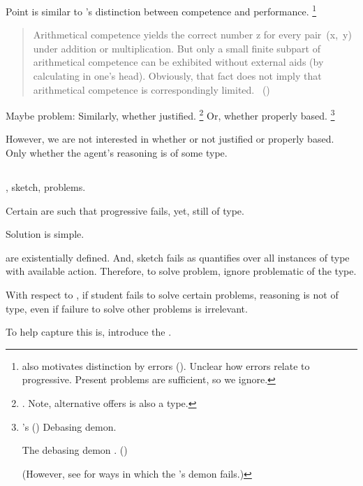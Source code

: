 \begin{note}
  Point is similar to \citeauthor{Chomsky:2015aa}'s distinction between competence and performance.%
  \footnote{
    \citeauthor{Chomsky:2015aa} also motivates distinction by errors (\citeyear[2]{Chomsky:2015aa}).
    Unclear how errors relate to progressive.
    Present problems are sufficient, so we ignore.
  }

  \begin{quote}
    Arithmetical competence yields the correct number z for every pair~(x,~y) under addition or multiplication.
    But only a small finite subpart of arithmetical competence can be exhibited without external aids (by calculating in one's head).
    Obviously, that fact does not imply that arithmetical competence is correspondingly limited.%
    \mbox{ }\hfill\mbox{(\citeyear[xii]{Chomsky:2015aa})}
  \end{quote}
\end{note}


\begin{note}
  Maybe problem:
  Similarly, whether justified.%
  \footnote{
    \citeauthor{Kripke:1982aa}.
    Note, alternative \citeauthor{Kripke:1982aa} offers is also a type.
  }
  Or, whether properly based.%
  \footnote{
    \citeauthor{Schaffer:2010vq}'s (\citeyear{Schaffer:2010vq}) Debasing demon.

    The debasing demon . (\citeyear[231]{Schaffer:2010vq})

    (However, see \textcite{Bondy:2018tk} for ways in which the \citeauthor{Schaffer:2010vq}'s demon fails.)
  }

  However, we are not interested in whether or not justified or properly based.
  Only whether the agent's reasoning is of some type.
\end{note}

\subsection{}

\label{cha:typical:sec:tR:RoToR}

\begin{note}
  \tor{}, sketch, problems.

  Certain  are such that progressive fails, yet, still of type.

  Solution is simple.

   are existentially defined.
  And, sketch fails as quantifies over all instances of type with available action.
  Therefore, to solve problem, ignore problematic  of the type.

  With respect to , if student fails to solve certain problems, reasoning is not of type, even if failure to solve other problems is irrelevant.

  To help capture this is, introduce the \rotor{}.
\end{note}

